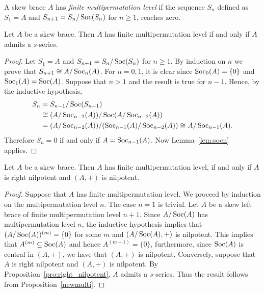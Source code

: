 

\begin{definition}\label{def:bracempl}
A skew brace $A$ has \emph{finite multipermutation level} if
the sequence $S_n$ defined as $S_1=A$ and $S_{n+1}=S_n/\operatorname{Soc}(S_n)$
for $n\geq1$, reaches zero.
\end{definition}

\begin{proposition}
\label{newmulti}
Let $A$ be a skew brace. Then $A$ has finite
multipermutation level if and only if $A$ admits a $s$-series.
\end{proposition}

\begin{proof}
Let $S_1=A$ and $S_{n+1}=S_n/\operatorname{Soc}(S_n)$ for
$n\geq1$. By induction on $n$ we prove that $S_{n+1}\cong A/\operatorname{Soc}_n(A)$. 
For $n=0,1$, it is clear since $\operatorname{Soc}_0(A)=\{0\}$ and $\operatorname{Soc}_1(A)=\operatorname{Soc}(A)$.
Suppose that $n>1$ and the result is true for $n-1$. Hence, by the
inductive hypothesis,
\begin{align*}
S_n&=S_{n-1}/\operatorname{Soc}(S_{n-1})\\
&\cong (A/\operatorname{Soc}_{n-2}(A))/\operatorname{Soc}(A/\operatorname{Soc}_{n-2}(A))\\
&=(A/\operatorname{Soc}_{n-2}(A))/(\operatorname{Soc}_{n-1}(A)/\operatorname{Soc}_{n-2}(A))\cong A/\operatorname{Soc}_{n-1}(A).
\end{align*} 
Therefore $S_n=0$ if and only if
$A=\operatorname{Soc}_{n-1}(A)$. Now Lemma~\ref{lem:socn} applies.
\end{proof}

\begin{theorem}
\label{thm:mpl&right_nilpotent}
Let $A$ be a skew brace. Then $A$ has finite multipermutation level, if and only
if  $A$ is right nilpotent and $(A,+)$ is nilpotent.
\end{theorem}

\begin{proof}
Suppose that $A$ has finite multipermutation level.
We proceed by induction on the multipermutation level $n$. The case
$n=1$ is trivial.  Let $A$ be a skew left brace of
    finite multipermutation level $n+1$. Since $A/\operatorname{Soc}(A)$ has multipermutation
    level $n$, the inductive hypothesis implies that $(A/\operatorname{Soc}(A))^{(m)}=\{0\}$ for
    some $m$ and $(A/\operatorname{Soc}(A),+)$ is nilpotent. This implies that
    $A^{(m)}\subseteq\operatorname{Soc}(A)$ and hence $A^{(m+1)}=\{0\}$, furthermore, since
    $\operatorname{Soc}(A)$ is central in $(A,+)$, we have that $(A,+)$ is nilpotent.
Conversely, suppose that $A$ is right nilpotent and $(A,+)$ is
nilpotent.  By Proposition~\ref{pro:right_nilpotent}, $A$ admits a
$s$-series. Thus the result follows from Proposition~\ref{newmulti}.
\end{proof}

